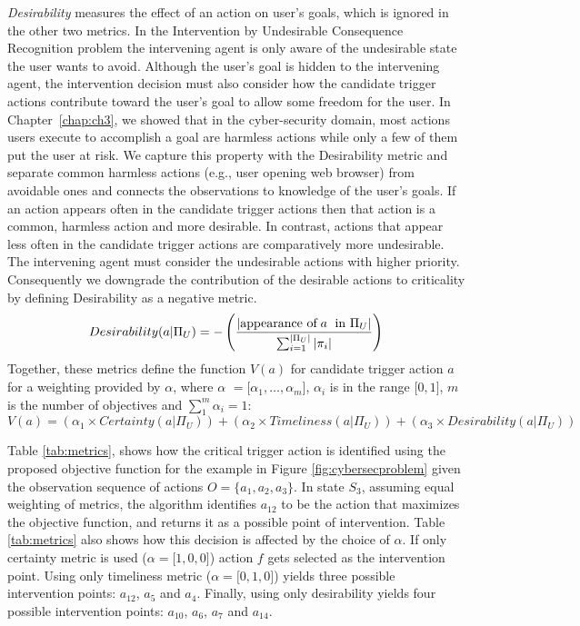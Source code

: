 {\it Desirability} measures the effect of an action on user's goals, which is ignored in the other two metrics. 
In the Intervention by Undesirable Consequence Recognition problem the intervening agent is only aware of the undesirable state the user wants to avoid.
Although the user's goal is hidden to the intervening agent, the intervention decision must also consider how the candidate trigger actions contribute toward the user's goal to allow some freedom for the user.
In Chapter~\ref{chap:ch3}, we showed that in the cyber-security domain, most actions users execute to accomplish a goal are harmless actions while only a few of them put the user at risk.
We capture this property with the Desirability metric and separate common harmless actions (e.g., user opening web browser) from avoidable ones and connects the observations to knowledge of the user's goals.
If an action appears often in the candidate trigger actions then that action is a common, harmless action and more desirable.
In contrast, actions that appear less often in the candidate trigger actions are comparatively more undesirable.
The intervening agent must consider the undesirable actions with higher priority.
Consequently we downgrade the contribution of the desirable actions to criticality by defining Desirability as a negative metric.
\begin{equation}
\label{eq:desirability}
Desirability (a|\Pi_U) = - \left( \frac{|\textup{appearance of}\; a\; \textup{ in } \Pi_U|}{\sum_{i=1}^{|\Pi_U|}\left | \pi_i \right |} \right)
\end{equation}
Together, these metrics define the function $V(a)$ for candidate trigger action $a$ for a weighting provided by $\alpha$, where $\alpha$ $=\lbrack\alpha_1, \ldots, \alpha_m \rbrack$, $\alpha_i$ is in the range $\lbrack0,1\rbrack$, $m$ is the number of objectives and $\sum_{1}^{m}\alpha_i = 1$:
\begin{equation}
\label{eq:function}
V(a) = (\alpha_1 \times Certainty (a|\Pi_U)) + (\alpha_2 \times Timeliness (a|\Pi_U)) + (\alpha_3 \times Desirability (a|\Pi_U))
\end{equation}

Table \ref{tab:metrics}, shows how the critical trigger action is identified using the proposed objective function for the example in Figure \ref{fig:cybersecproblem} given the observation sequence of actions $O=\{a_1, a_2, a_3\}$. 
In state $S_{3}$, assuming equal weighting of metrics, the algorithm identifies $a_{12}$ to be the action that maximizes the objective function, and returns it as a possible point of intervention. 
Table \ref{tab:metrics} also shows how this decision is affected by the choice of $\alpha$. If only certainty metric is used ($\alpha=\lbrack1,0,0\rbrack$) action $f$ gets selected as the intervention point. 
Using only timeliness metric ($\alpha=\lbrack0,1,0\rbrack$) yields three possible intervention points: $a_{12}$, $a_5$ and $a_4$. 
Finally, using only desirability yields four possible intervention points: $a_{10}$, $a_6$, $a_7$ and $a_{14}$.

